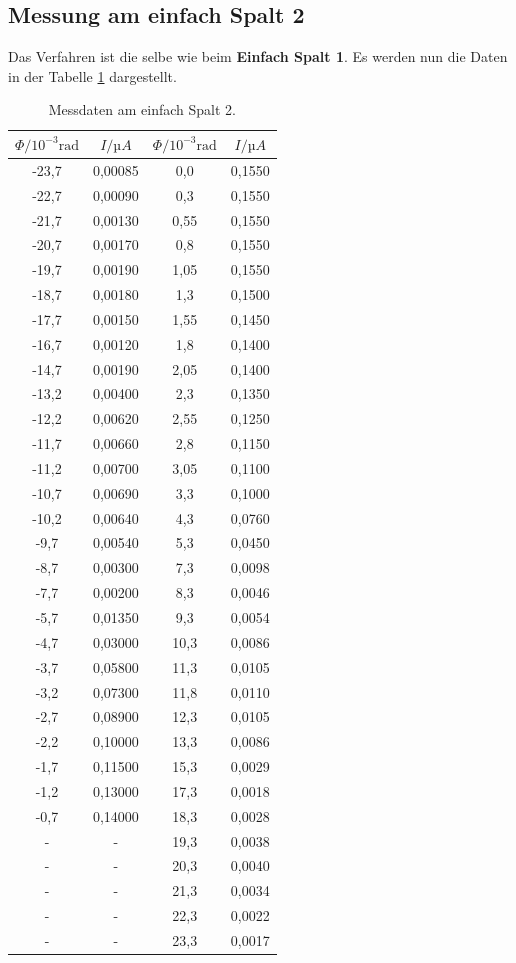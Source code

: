 \subsection{Messung am einfach Spalt 2}
Das Verfahren ist die selbe wie beim \textbf{Einfach Spalt 1}. Es werden nun die Daten
in der Tabelle \ref{tab:2} dargestellt.
\begin{table}[H]
  \centering
  \caption{Messdaten am einfach Spalt 2.}
  \label{tab:2}
  \begin{tabular}{c c c c}
    \toprule
    $\Phi / 10^{-3}\text{rad}$ & $I / µA $ &$\Phi / 10^{-3}\text{rad}$ & $I / µA$\\
    \midrule
    -23,7 & 0,00085 & 0,0  & 0,1550\\
    -22,7 & 0,00090 & 0,3  & 0,1550\\
    -21,7 & 0,00130 & 0,55 & 0,1550\\
    -20,7 & 0,00170 & 0,8  & 0,1550\\
    -19,7 & 0,00190 & 1,05 & 0,1550\\
    -18,7 & 0,00180 & 1,3  & 0,1500\\
    -17,7 & 0,00150 & 1,55 & 0,1450\\
    -16,7 & 0,00120 & 1,8  & 0,1400\\
    -14,7 & 0,00190 & 2,05 & 0,1400\\
    -13,2 & 0,00400 & 2,3  & 0,1350\\
    -12,2 & 0,00620 & 2,55 & 0,1250\\
    -11,7 & 0,00660 & 2,8  & 0,1150\\
    -11,2 & 0,00700 & 3,05 & 0,1100\\
    -10,7 & 0,00690 & 3,3  & 0,1000\\
    -10,2 & 0,00640 & 4,3  & 0,0760\\
     -9,7 & 0,00540 & 5,3  & 0,0450\\
     -8,7 & 0,00300 & 7,3  & 0,0098\\
     -7,7 & 0,00200 & 8,3  & 0,0046\\
     -5,7 & 0,01350 & 9,3  & 0,0054\\
     -4,7 & 0,03000 & 10,3 & 0,0086\\
     -3,7 & 0,05800 & 11,3 & 0,0105\\
     -3,2 & 0,07300 & 11,8 & 0,0110\\
     -2,7 & 0,08900 & 12,3 & 0,0105\\
     -2,2 & 0,10000 & 13,3 & 0,0086\\
     -1,7 & 0,11500 & 15,3 & 0,0029\\
     -1,2 & 0,13000 & 17,3 & 0,0018\\
     -0,7 & 0,14000 & 18,3 & 0,0028\\
        - &    -    & 19,3 & 0,0038\\
        - &    -    & 20,3 & 0,0040\\
        - &    -    & 21,3 & 0,0034\\
        - &    -    & 22,3 & 0,0022\\
        - &    -    & 23,3 & 0,0017\\
    \bottomrule
  \end{tabular}
\end{table}
